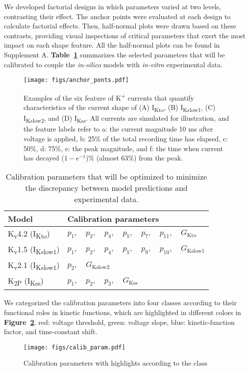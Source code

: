 \documentclass[11pt]{article}
\begin{document}
We developed factorial designs in which parameters varied at two levels, contrasting their effect. The anchor points were evaluated at each design to calculate factorial effects. Then, half-normal plots were drawn based on these contrasts, providing visual inspections of critical parameters that exert the most impact on each shape feature. All the half-normal plots can be found in Supplement A. \textbf{Table~\ref{tab:calib_param}} summarizes the selected parameters that will be calibrated to couple the \textit{in-silico} models with \textit{in-vitro} experimental data. 
\begin{figure}[!ht]
    \centering
    \texttt{[image: figs/anchor\_ponts.pdf]}
    \caption{Examples of the six feature of K\textsuperscript{+} currents that quantify characteristics of the current shape of (A) I\textsubscript{Kto}, (B) I\textsubscript{Kslow1}, (C) I\textsubscript{Kslow2}, and (D) I\textsubscript{Kss}. All currents are simulated for illustration, and the feature labels refer to a: the current magnitude 10 ms after voltage is applied, b: 25\% of the total recording time has elapsed, c: 50\%, d: 75\%, e: the peak magnitude, and f: the time when current has decayed ($1-e^{-1}$)\% (almost 63\%) from the peak.}
    \label{fig:current_feature}
\end{figure}
\begin{table}
    \centering
    \caption{Calibration parameters that will be optimized to minimize the discrepancy between model predictions and experimental data.}
    \begin{tabular}{l|l}
        \hline
        Model & Calibration parameters \\
        \hline
        K\textsubscript{v}4.2 (I\textsubscript{Kto}) & $p_{1},\quad p_{2},\quad p_{4},\quad p_{5},\quad p_{7},\quad p_{11},\quad G_{\mathrm{Kto}}$ \\
        K\textsubscript{v}1.5 (I\textsubscript{Kslow1}) & $p_{1},\quad p_{2},\quad p_{4},\quad p_{5},\quad p_{9},\quad p_{10},\quad G_{\mathrm{Kslow1}}$ \\
        K\textsubscript{v}2.1 (I\textsubscript{Kslow1}) & $p_{2},\quad G_{\mathrm{Kslow2}}$ \\
        K\textsubscript{2P} (I\textsubscript{Kss}) & $p_{1},\quad p_{2},\quad p_{3},\quad G_{\mathrm{Kss}}$ \\
        \hline
    \end{tabular}
    \label{tab:calib_param}
\end{table}

We categorized the calibration parameters into four classes according to their functional roles in kinetic functions, which are highlighted in different colors in \textbf{Figure~\ref{fig:calib_param}}. 
red: voltage threshold, green: voltage slope, blue: kinetic-function factor, and time-constant shift. 
\begin{figure}[!ht]
    \centering
    \texttt{[image: figs/calib\_param.pdf]}
    \caption{Calibration parameters with highlights according to the class}
    \label{fig:calib_param}
\end{figure}
\end{document}
